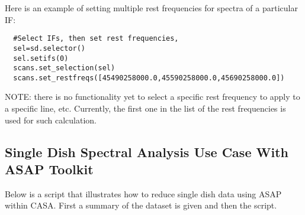 Here is an example of setting multiple rest frequencies for spectra of a particular IF:
\begin{verbatim}
  #Select IFs, then set rest frequencies,
  sel=sd.selector()
  sel.setifs(0)
  scans.set_selection(sel)
  scans.set_restfreqs([45490258000.0,45590258000.0,45690258000.0])
\end{verbatim}

NOTE: there is no functionality yet to select a specific rest frequency 
to apply to a specific line, etc. Currently, the first one in the list
of the rest frequencies is used for such calculation.

 
\subsection{Single Dish Spectral Analysis Use Case With ASAP Toolkit}
\label{subsection:sd.asap.usecase}

Below is a script that illustrates how to reduce single dish data
using ASAP within CASA.  First a summary of the dataset is given and
then the script.

